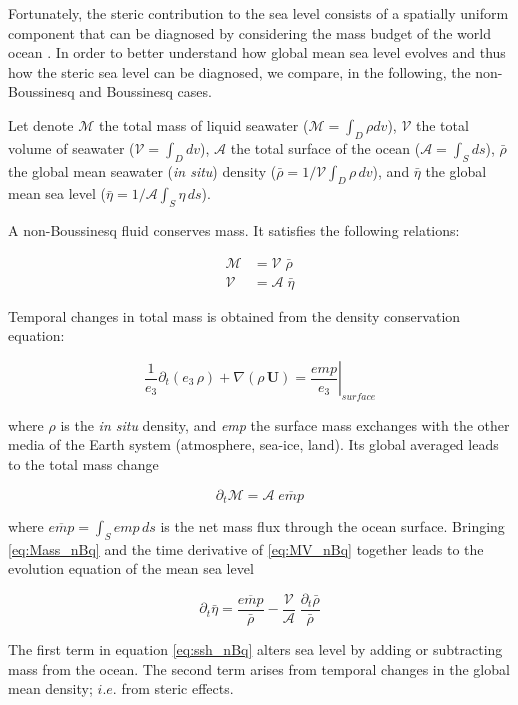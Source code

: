 \documentclass[../tex_main/NEMO_manual]{subfiles}
\begin{document}
Fortunately, the steric contribution to the sea level consists of a spatially uniform component that
can be diagnosed by considering the mass budget of the world ocean \citep{Greatbatch_JGR94}.
In order to better understand how global mean sea level evolves and thus how the steric sea level can be diagnosed,
we compare, in the following, the non-Boussinesq and Boussinesq cases.

Let denote
$\mathcal{M}$ the total mass    of liquid seawater ($\mathcal{M} = \int_D \rho dv$), 
$\mathcal{V}$ the total volume  of        seawater      ($\mathcal{V} = \int_D dv$), 
$\mathcal{A}$ the total surface of       the ocean      ($\mathcal{A} = \int_S ds$), 
$\bar{\rho}$ the global mean  seawater (\textit{in situ}) density 
($\bar{\rho} = 1/\mathcal{V} \int_D \rho \,dv$), and
$\bar{\eta}$ the global mean sea level 
($\bar{\eta} = 1/\mathcal{A} \int_S \eta \,ds$).

A non-Boussinesq fluid conserves mass. It satisfies the following relations:

\[	\begin{split}
		\mathcal{M} &=  \mathcal{V}  \;\bar{\rho} \\
		\mathcal{V} &=  \mathcal{A}  \;\bar{\eta}
	\end{split}  \label{eq:MV_nBq}
\]

Temporal changes in total mass is obtained from the density conservation equation:

\[ \frac{1}{e_3} \partial_t ( e_3\,\rho) + \nabla( \rho \, \textbf{U} ) 
	= \left. \frac{\textit{emp}}{e_3}\right|_\textit{surface}
 \label{eq:Co_nBq} \]

where $\rho$ is the \textit{in situ} density, and \textit{emp} the surface mass exchanges with the other media of
the Earth system (atmosphere, sea-ice, land).
Its global averaged leads to the total mass change 

\[ \partial_t \mathcal{M} = \mathcal{A} \;\overline{\textit{emp}}
 \label{eq:Mass_nBq} \]

where $\overline{\textit{emp}} = \int_S \textit{emp}\,ds$ is the net mass flux through the ocean surface.
Bringing \autoref{eq:Mass_nBq} and the time derivative of \autoref{eq:MV_nBq} together leads to
the evolution equation of the mean sea level

\[ \partial_t \bar{\eta} = \frac{\overline{\textit{emp}}}{ \bar{\rho}} 
                         - \frac{\mathcal{V}}{\mathcal{A}} \;\frac{\partial_t \bar{\rho} }{\bar{\rho}}
 \label{eq:ssh_nBq} \]

The first term in equation \autoref{eq:ssh_nBq} alters sea level by adding or subtracting mass from the ocean. 
The second term arises from temporal changes in the global mean density; $i.e.$ from steric effects.
\end{document}
